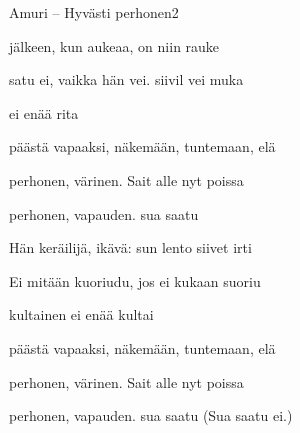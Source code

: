 \documentclass[11pt,a4paper]{article}
\begin{document}
\thispagestyle{empty}
\begin{mysong}{Amuri – Hyvästi perhonen}{2}

\begin{SBVerse}
   jälkeen, kun  aukeaa, on  niin
   rauke

   satu ei, vaikka  hän vei. 
  siivil vei muka

    ei  enää
   rita

   päästä vapaaksi,  näkemään, 
  tuntemaan,  elä
\end{SBVerse}

\begin{SBChorus}
   perhonen,  värinen. Sait  alle
   nyt poissa 

   perhonen,  vapauden.
   sua saatu 
\end{SBChorus}


\begin{SBVerse}
  Hän  keräilijä,  ikävä:  sun lento
   siivet irti 

  Ei  mitään  kuoriudu, jos ei 
  kukaan  suoriu

    kultainen ei  enää
   kultai

   päästä vapaaksi,  näkemään, 
  tuntemaan,  elä
\end{SBVerse}

\begin{SBChorus}
   perhonen,  värinen. Sait  alle
   nyt poissa 

   perhonen,  vapauden.
   sua saatu  (Sua saatu ei.)
\end{SBChorus}


\end{mysong}
\end{document}
